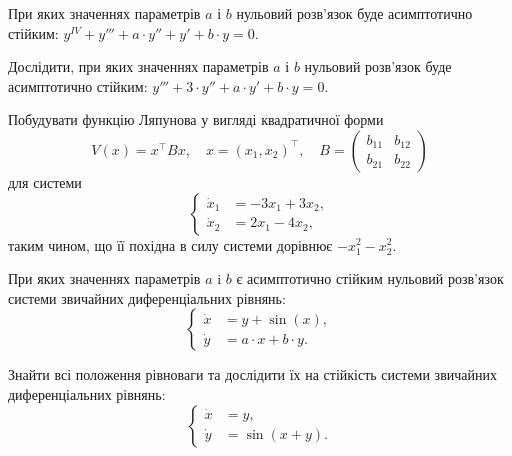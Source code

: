 \begin{problem}
	При яких значеннях параметрів $a$ і $b$ нульовий розв'язок буде асимптотично стійким: $y^{IV} + y''' + a \cdot y'' + y' + b \cdot y = 0$.
\end{problem}

\begin{problem}
	Дослідити, при яких значеннях параметрів $a$ і $b$ нульовий розв'язок буде асимптотично стійким: $y''' + 3 \cdot y'' + a \cdot y' + b \cdot y = 0$.
\end{problem}

\begin{problem}
	Побудувати функцію Ляпунова у вигляді квадратичної форми
	\[V(x) = x^\intercal B x, \quad x = (x_1, x_2)^\intercal, \quad B = \begin{pmatrix} b_{11} & b_{12} \\ b_{21} & b_{22} \end{pmatrix}\]
	для системи
	\[\left\{ \begin{aligned} \dot x_1 &= - 3 x_1 + 3 x_2, \\ \dot x_2 &= 2 x_1 - 4 x_2, \end{aligned} \right.\]
	таким чином, що її похідна в силу системи дорівнює $-x_1^2 - x_2^2$.
\end{problem}

\begin{problem}
	При яких значеннях параметрів $a$ i $b$ є асимптотично стійким нульовий розв'язок системи звичайних диференціальних рівнянь:
	\[\left\{ \begin{aligned} \dot x &= y + \sin (x), \\ \dot y &= a \cdot x + b \cdot y. \end{aligned} \right.\]
\end{problem}

\begin{problem}
	Знайти всі положення рівноваги та дослідити їх на стійкість системи звичайних диференціальних рівнянь:
	\[\left\{ \begin{aligned} \dot x &= y, \\ \dot y &= \sin (x + y). \end{aligned} \right.\]
\end{problem}
